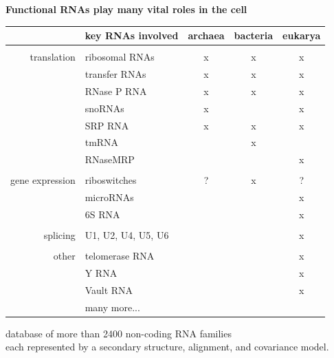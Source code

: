 \documentclass[landscape]{slides}
\begin{document}
\begin{slide}
\begin{center}
\textbf{Functional RNAs play many vital roles in the cell}
\end{center}
\medskip

\small
\begin{center}
\begin{tabular}{r|l|ccc}
 & key RNAs involved & archaea & bacteria & eukarya \\ \hline
 & \\ 
translation & ribosomal RNAs & x & x & x \\
            & transfer RNAs  & x & x & x \\
            & RNase P RNA    & x & x & x \\
            & snoRNAs        & x &   & x \\ 
            & SRP RNA        & x & x & x \\ 
            & tmRNA          &   & x &   \\ 
            & RNaseMRP       &   &   & x \\ 
            &  \\ 
gene expression & riboswitches & ? & x & ? \\
                & microRNAs &  & & x \\
                & 6S RNA & & & x\\ 
                & \\ 
splicing        & U1, U2, U4, U5, U6 & & & x \\ 
                & \\
other           & telomerase RNA & & & x \\ 
                & Y RNA          & & & x \\
                & Vault RNA      & & & x \\
                & many more... & & & \\ 
\end{tabular}



database of more than 2400 non-coding RNA families \\ each represented by a
secondary structure, alignment, and covariance model.
\end{center}

\vfill
\end{slide}
\end{document}
